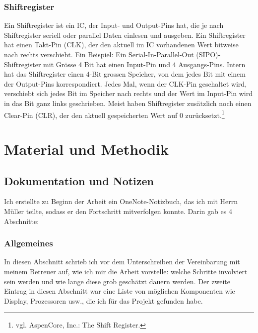 \documentclass[12pt, a4paper]{report}
\begin{document}
\subsection{Shiftregister} \label{Shiftregister}
Ein Shiftregister ist ein IC, der Input- und Output-Pins hat, die je nach Shiftregister seriell oder parallel Daten einlesen und ausgeben. Ein Shiftregister hat einen Takt-Pin (CLK), der den aktuell im IC vorhandenen Wert bitweise nach rechts verschiebt. Ein Beispiel: Ein Serial-In-Parallel-Out (SIPO)-Shiftregister mit Grösse 4 Bit hat einen Input-Pin und 4 Ausgangs-Pins. Intern hat das Shiftregister einen 4-Bit grossen Speicher, von dem jedes Bit mit einem der Output-Pins korrespondiert. Jedes Mal, wenn der CLK-Pin geschaltet wird, verschiebt sich jedes Bit im Speicher nach rechts und der Wert im Input-Pin wird in das Bit ganz links geschrieben. Meist haben Shiftregister zusätzlich noch einen Clear-Pin (CLR), der den aktuell gespeicherten Wert auf 0 zurücksetzt.\footnote{vgl. AspenCore, Inc.: The Shift Register.}
\chapter{Material und Methodik}
\section{Dokumentation und Notizen}
Ich erstellte zu Beginn der Arbeit ein OneNote-Notizbuch, das ich mit Herrn Müller teilte, sodass er den Fortschritt mitverfolgen konnte. Darin gab es 4 Abschnitte:
\subsection{Allgemeines}
In diesen Abschnitt schrieb ich vor dem Unterschreiben der Vereinbarung mit meinem Betreuer auf, wie ich mir die Arbeit vorstelle: welche Schritte involviert sein werden und wie lange diese grob geschätzt dauern werden. Der zweite Eintrag in diesen Abschnitt war eine Liste von möglichen Komponenten wie Display, Prozessoren usw., die ich für das Projekt gefunden habe.
\end{document}
